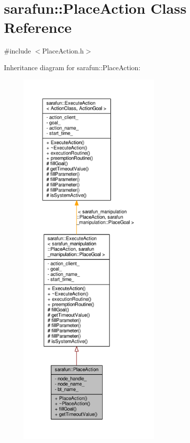 \hypertarget{classsarafun_1_1PlaceAction}{\section{sarafun\-:\-:Place\-Action Class Reference}
\label{classsarafun_1_1PlaceAction}
}


{\ttfamily \#include $<$Place\-Action.\-h$>$}



Inheritance diagram for sarafun\-:\-:Place\-Action\-:\nopagebreak
\begin{figure}[H]
\begin{center}
\leavevmode
\includegraphics[height=550pt]{dd/d57/classsarafun_1_1PlaceAction__inherit__graph}
\end{center}
\end{figure}



